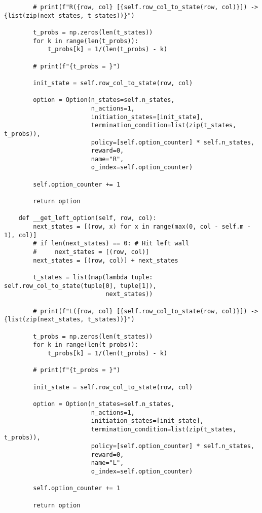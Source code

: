 \begin{verbatim}
        # print(f"R({row, col} [{self.row_col_to_state(row, col)}]) -> {list(zip(next_states, t_states))}")

        t_probs = np.zeros(len(t_states))
        for k in range(len(t_probs)):
            t_probs[k] = 1/(len(t_probs) - k)

        # print(f"{t_probs = }")

        init_state = self.row_col_to_state(row, col)

        option = Option(n_states=self.n_states,
                        n_actions=1,
                        initiation_states=[init_state],
                        termination_condition=list(zip(t_states, t_probs)),
                        policy=[self.option_counter] * self.n_states,
                        reward=0,
                        name="R",
                        o_index=self.option_counter)

        self.option_counter += 1

        return option

    def __get_left_option(self, row, col):
        next_states = [(row, x) for x in range(max(0, col - self.m - 1), col)]
        # if len(next_states) == 0: # Hit left wall
        #     next_states = [(row, col)]
        next_states = [(row, col)] + next_states

        t_states = list(map(lambda tuple: self.row_col_to_state(tuple[0], tuple[1]),
                            next_states))

        # print(f"L({row, col} [{self.row_col_to_state(row, col)}]) -> {list(zip(next_states, t_states))}")

        t_probs = np.zeros(len(t_states))
        for k in range(len(t_probs)):
            t_probs[k] = 1/(len(t_probs) - k)

        # print(f"{t_probs = }")

        init_state = self.row_col_to_state(row, col)

        option = Option(n_states=self.n_states,
                        n_actions=1,
                        initiation_states=[init_state],
                        termination_condition=list(zip(t_states, t_probs)),
                        policy=[self.option_counter] * self.n_states,
                        reward=0,
                        name="L",
                        o_index=self.option_counter)

        self.option_counter += 1

        return option


\end{verbatim}
